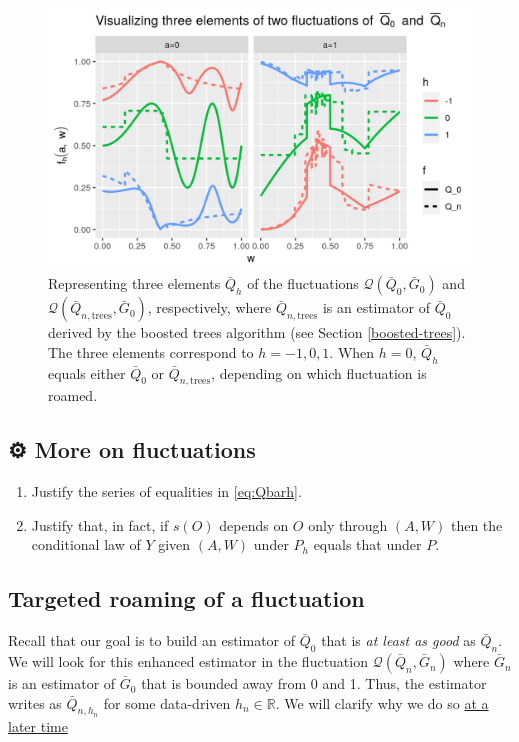 \documentclass[
  11pt,
  openright,twoside]{book}
\newcommand{\gear}{\usebox{\gearbox}\;}
\newcommand{\bbR}{\mathbb{R}}
\newcommand{\calQ}{\mathcal{Q}}
\newcommand{\Gbar}{\bar{G}}
\newcommand{\Qbar}{\bar{Q}}
\theoremstyle{definition}
\theoremstyle{definition}
\theoremstyle{definition}
\theoremstyle{definition}
\theoremstyle{remark}
\begin{document}
\begin{figure}

{\centering \includegraphics[width=0.7\linewidth]{img/fluctuation-1} 

}

\caption{Representing three elements \(\Qbar_{h}\) of the fluctuations \(\calQ(\Qbar_{0}, \Gbar_{0})\) and \(\calQ(\Qbar_{n,\text{trees}}, \Gbar_{0})\), respectively, where \(\Qbar_{n,\text{trees}}\) is an estimator of \(\Qbar_{0}\) derived by the boosted trees algorithm (see Section \ref{boosted-trees}). The three elements correspond to \(h=-1,0,1\). When \(h=0\), \(\Qbar_{h}\) equals either \(\Qbar_{0}\) or \(\Qbar_{n,\text{trees}}\), depending on which fluctuation is roamed.}\label{fig:fluctuation}
\end{figure}

\hypertarget{exo-fluct}{%
\subsection{\texorpdfstring{⚙ \gear More on fluctuations}{⚙ More on fluctuations}}\label{exo-fluct}}

\begin{enumerate}
\def\labelenumi{\arabic{enumi}.}
\item
  Justify the series of equalities in \eqref{eq:Qbarh}.
\item
  Justify that, in fact, if \(s(O)\) depends on \(O\) only through \((A,W)\) then
  the conditional law of \(Y\) given \((A,W)\) under \(P_{h}\) equals that under
  \(P\).
\end{enumerate}

\hypertarget{roaming}{%
\subsection{Targeted roaming of a fluctuation}\label{roaming}}

Recall that our goal is to build an estimator of \(\Qbar_0\) that is \emph{at least
as good} as \(\Qbar_n\). We will look for this enhanced estimator in the
fluctuation \(\calQ(\Qbar_{n}, \Gbar_{n})\) where \(\Gbar_{n}\) is an estimator of
\(\Gbar_{0}\) that is bounded away from 0 and 1. Thus, the estimator writes as
\(\Qbar_{n,h_{n}}\) for some data-driven \(h_{n} \in \bbR\). We will clarify why
we do so \protect\hyperlink{fluct-justification}{at a later time}
\end{document}
